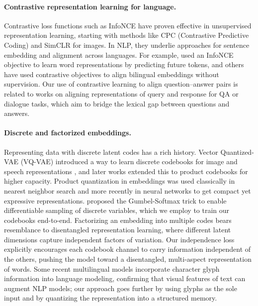 \documentclass[10pt,twocolumn]{article}
\begin{document}
\paragraph{Contrastive representation learning for language.} Contrastive loss functions such as InfoNCE \citep{infocpc} have proven effective in unsupervised representation learning, starting with methods like CPC (Contrastive Predictive Coding) and SimCLR for images. In NLP, they underlie approaches for sentence embedding and alignment across languages. For example, \citep{infocpc} used an InfoNCE objective to learn word representations by predicting future tokens, and others have used contrastive objectives to align bilingual embeddings without supervision. Our use of contrastive learning to align question--answer pairs is related to works on aligning representations of query and response for QA or dialogue tasks, which aim to bridge the lexical gap between questions and answers.

\paragraph{Discrete and factorized embeddings.} Representing data with discrete latent codes has a rich history. Vector Quantized-VAE (VQ-VAE) introduced a way to learn discrete codebooks for image and speech representations \citep{jang2017gumbel}, and later works extended this to product codebooks for higher capacity. Product quantization in embeddings was used classically in nearest neighbor search and more recently in neural networks to get compact yet expressive representations. \citep{jang2017gumbel} proposed the Gumbel-Softmax trick to enable differentiable sampling of discrete variables, which we employ to train our codebooks end-to-end. Factorizing an embedding into multiple codes bears resemblance to disentangled representation learning, where different latent dimensions capture independent factors of variation. Our independence loss explicitly encourages each codebook channel to carry information independent of the others, pushing the model toward a disentangled, multi-aspect representation of words. Some recent multilingual models incorporate character glyph information into language modeling, confirming that visual features of text can augment NLP models; our approach goes further by using glyphs as the sole input and by quantizing the representation into a structured memory.
\end{document}
